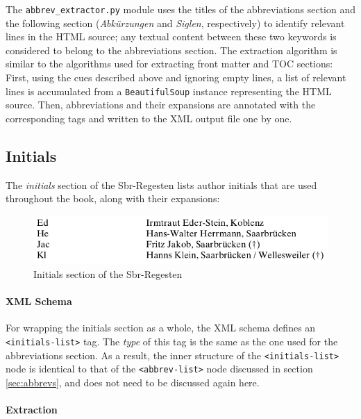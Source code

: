The \texttt{abbrev\_extractor.py} module uses the titles of the
abbreviations section and the following section (\emph{Abkürzungen}
and \emph{Siglen}, respectively) to identify relevant lines in the
HTML source; any textual content between these two keywords is
considered to belong to the abbreviations section. The extraction
algorithm is similar to the algorithms used for extracting front
matter and TOC sections: First, using the cues described above and
ignoring empty lines, a list of relevant lines is accumulated from a
\texttt{BeautifulSoup} instance representing the HTML source. Then,
abbreviations and their expansions are annotated with the
corresponding tags and written to the XML output file one by one.

\subsection{Initials}
\label{sec:initials}

The \emph{initials} section of the Sbr-Regesten lists author initials
that are used throughout the book, along with their expansions:

\begin{figure}[h]
  \centering
  \includegraphics[width=1.0\textwidth]{img/initials}
  \caption{Initials section of the Sbr-Regesten}
  \label{fig:initials}
\end{figure}

\paragraph{XML Schema}

For wrapping the initials section as a whole, the XML schema defines
an \texttt{<initials-list>} tag. The \emph{type} of this tag is the
same as the one used for the abbreviations section. As a result, the
inner structure of the \texttt{<initials-list>} node is identical to
that of the \texttt{<abbrev-list>} node discussed in section
\ref{sec:abbrevs}, and does not need to be discussed again here.

\paragraph{Extraction}

